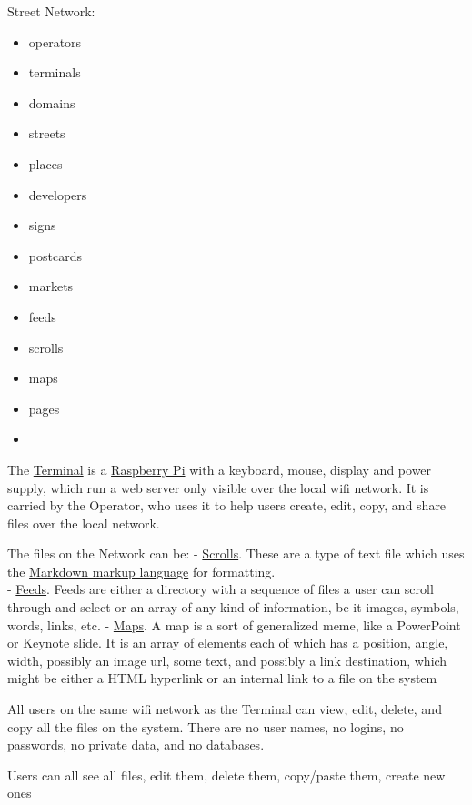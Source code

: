 Street Network:

\begin{itemize}
  \tightlist
  \item
  operators  
  \item
  terminals
  \item
  domains
  \item
  streets
  \item
  places
  \item
  developers
  \item
  signs
  \item 
  postcards
  \item
  markets
  \item
  feeds
  \item
  scrolls
  \item
  maps
  \item
  pages
  \item  
\end{itemize}






The \href{scrolls/terminal.md}{Terminal} is a
\href{https://www.raspberrypi.org/}{Raspberry Pi} with a keyboard,
mouse, display and power supply, which run a web server only visible
over the local wifi network. It is carried by the Operator, who uses it
to help users create, edit, copy, and share files over the local
network.

The files on the Network can be: - \href{scrolls/scrolls.md}{Scrolls}.
These are a type of text file which uses the
\href{https://daringfireball.net/projects/markdown/}{Markdown markup
language} for formatting.\\
- \href{scrolls/feeds.md}{Feeds}. Feeds are either a directory with a
sequence of files a user can scroll through and select or an array of
any kind of information, be it images, symbols, words, links, etc. -
\href{scrolls/maps.md}{Maps}. A map is a sort of generalized meme, like
a PowerPoint or Keynote slide. It is an array of elements each of which
has a position, angle, width, possibly an image url, some text, and
possibly a link destination, which might be either a HTML hyperlink or
an internal link to a file on the system

All users on the same wifi network as the Terminal can view, edit,
delete, and copy all the files on the system. There are no user names,
no logins, no passwords, no private data, and no databases.

Users can all see all files, edit them, delete them, copy/paste them,
create new ones

